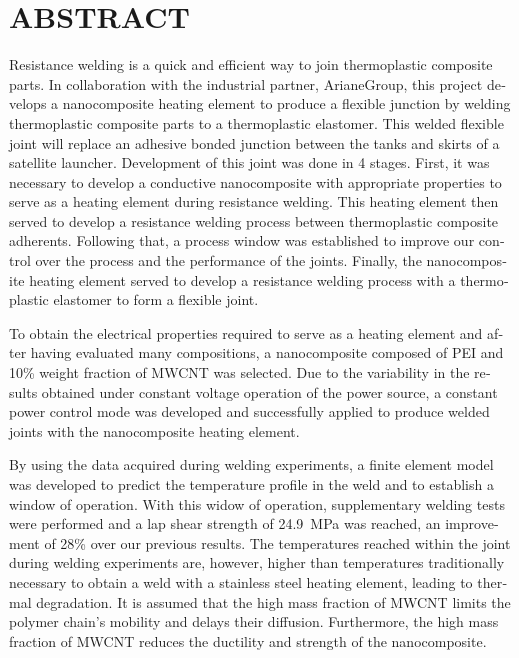 %

\chapter*{ABSTRACT}\thispagestyle{headings}
%
\begin{otherlanguage}{english}
	
	Resistance welding is a quick and efficient way to join thermoplastic composite parts. 
	In collaboration with the industrial partner, ArianeGroup, this project develops a nanocomposite heating element to produce a flexible junction by welding thermoplastic composite parts to a thermoplastic elastomer. 
	This welded flexible joint will replace an adhesive bonded junction between the tanks and skirts of a satellite launcher. 
	Development of this joint was done in 4 stages. 
	First, it was necessary to develop a conductive nanocomposite with appropriate properties to serve as a heating element during resistance welding. 
	This heating element then served to develop a resistance welding process between thermoplastic composite adherents. 
	Following that, a process window was established to improve our control over the process and the performance of the joints. 
	Finally, the nanocomposite heating element served to develop a resistance welding process with a thermoplastic elastomer to form a flexible joint. 
	
	To obtain the electrical properties required to serve as a heating element and after having evaluated many compositions, a nanocomposite composed of PEI and 10\% weight fraction of MWCNT was selected. 
	Due to the variability in the results obtained under constant voltage operation of the power source, a constant power control mode was developed and successfully applied to produce welded joints with the nanocomposite heating element. 
	
	By using the data acquired during welding experiments, a finite element model was developed to predict the temperature profile in the weld and to establish a window of operation. 
	With this widow of operation, supplementary welding tests were performed and a lap shear strength of \SI{24.9}{\mega\pascal} was reached, an improvement of 28\% over our previous results. 
	The temperatures reached within the joint during welding experiments are, however, higher than temperatures traditionally necessary to obtain a weld with a stainless steel heating element, leading to thermal degradation. 
	It is assumed that the high mass fraction of MWCNT limits the polymer chain's mobility and delays their diffusion. 
	Furthermore, the high mass fraction of MWCNT reduces the ductility and strength of the nanocomposite. 
	

\end{otherlanguage}

